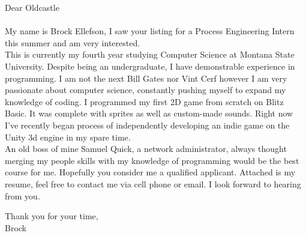 \documentclass[a4paper,12pt]{letter}
\author{Brock Ellefson} %
\begin{document}
Dear Oldcastle\\\\
My name is Brock Ellefson, I saw your listing for a Process Engineering Intern this summer and am very interested.  \\ 


This is currently my fourth year studying Computer Science at Montana State University. Despite being an undergraduate, I have demonstrable  experience in programming. I am not the next Bill Gates nor Vint Cerf however I am very passionate about computer science, constantly pushing myself to expand my knowledge of coding. I programmed my first 2D game from scratch on Blitz Basic. It was complete with sprites as well as custom-made sounds. Right now I've recently began process of independently developing an indie game on the Unity 3d engine in my spare time.\\   


An old boss of mine Samuel Quick, a network administrator, always thought merging my people skills with my knowledge of programming would be the best course for me. Hopefully you consider me a qualified applicant. Attached is my resume, feel free to contact me via cell phone or email. I look forward to hearing from you.


Thank you for your time, \\
Brock
\end{document}
